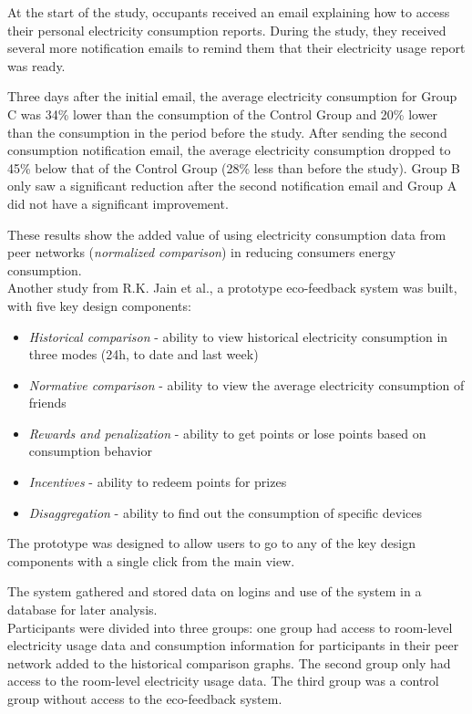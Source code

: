 \documentclass[journal]{vgtc}                %
\begin{document}
At the start of the study, occupants received an email explaining how to access their personal electricity consumption reports. During the study, they received several more notification emails to remind them that their electricity usage report was ready.

Three days after the initial email, the average electricity consumption for Group C was 34\% lower than the consumption of the Control Group and 20\% lower than the consumption in the period before the study.
After sending the second consumption notification email, the average electricity consumption dropped to 45\% below that of the Control Group (28\% less than before the study).
Group B only saw a significant reduction after the second notification email and Group A did not have a significant improvement.

These results show the added value of using electricity consumption data from peer networks (\textit{normalized comparison}) in reducing consumers energy consumption.
~\\

Another study from R.K. Jain et al.\cite{jain2012assessing}, a prototype eco-feedback system was built, with five key design components:
\begin{itemize}
\item \textit{Historical comparison} - ability to view historical electricity consumption in three modes (24h, to date and last week)
\item \textit{Normative comparison} - ability to view the average electricity consumption of friends
\item \textit{Rewards and penalization} - ability to get points or lose points based on consumption behavior
\item \textit{Incentives} - ability to redeem points for prizes
\item \textit{Disaggregation} - ability to find out the consumption of specific devices
\end{itemize}

The prototype was designed to allow users to go to any of the key design components with a single click from the main view.

The system gathered and stored data on logins and use of the system in a database for later analysis.\\

Participants were divided into three groups: one group had access to room-level electricity usage data and consumption information for participants in their peer network added to the historical comparison graphs. 
The second group only had access to the room-level electricity usage data.
The third group was a control group without access to the eco-feedback system.
\end{document}
